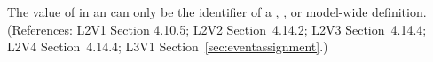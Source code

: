 The value of  in an \EventAssignment can only be the
identifier of a \Compartment, \Species, or model-wide \Parameter
definition.  (References: L2V1 Section 4.10.5; L2V2 Section~4.14.2;
L2V3 Section~4.14.4; L2V4 Section~4.14.4; L3V1 Section~\ref{sec:eventassignment}.)
